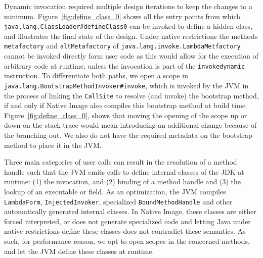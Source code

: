 Dynamic invocation required multiple design iterations to keep the changes to a minimum. Figure~\ref{fig:define_class_0} shows all the entry points from which \verb|java.lang.ClassLoader#defineClass0| can be invoked to define a hidden class, and illustrates the final state of the design.  
Under native restrictions the methods \verb|metafactory| and \verb|altMetafactory| of \verb|java.lang.invoke.LambdaMetfactory| cannot be invoked directly form user code as this would allow for the execution of arbitrary code at runtime, unless the invocation is part of the \verb|invokedynamic| instruction. To differentiate both paths, we open a scope in \verb|java.lang.BootstrapMethodInvoker#invoke|, which is invoked by the JVM in the process of linking the \verb|CallSite| to resolve (and invoke) the bootstrap method, if and only if Native Image also compiles this bootstrap method at build time
Figure~\ref{fig:define_class_0}, shows that moving the opening of the scope up or down on the stack trace would mean introducing an additional change because of the branching out. We also do not have the required metadata on the bootstrap method to place it in the JVM.   


Three main categories of user calls can result in the resolution of a method handle such that the JVM emits calls to define internal classes of the JDK at runtime: (1) the invocation, and (2) binding of a method handle and (3) the lookup of an executable or field. As an optimization, the JVM compiles \verb|LambdaForm|, \verb|InjectedInvoker|, specialized \verb|BoundMethodHandle| and other automatically generated internal classes. 
In Native Image, these classes are either forced interpreted, or does not generate specialized code and letting Java under native restrictions define these classes does not contradict these semantics. As such, for performance reason, we opt to open scopes in the concerned methods, and let the JVM define these classes at runtime.

